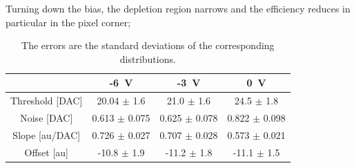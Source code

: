    Turning down the bias, the depletion region narrows and the efficiency reduces in particular in the pixel corner; 
    \begin{table}
            \begin{center}
            \begin{tabular}{| c |  c | c | c |}
            \hline
               & -\SI{6}{V} & -\SI{3}{V} & \SI{0}{V}\\
            \hline
            \hline
            Threshold [DAC] & 20.04 $\pm$ 1.6 & 21.0 $\pm$ 1.6 & 24.5 $\pm$ 1.8\\
            Noise [DAC] & 0.613 $\pm$ 0.075 & 0.625 $\pm$ 0.078 & 0.822 $\pm$ 0.098\\
            Slope [au/DAC] & 0.726 $\pm$ 0.027 & 0.707 $\pm$ 0.028  & 0.573 $\pm$ 0.021\\
            Offset [au] & -10.8 $\pm$ 1.9 & -11.2 $\pm$ 1.8 & -11.1 $\pm$ 1.5 \\
            \hline
            \end{tabular}
            \caption{The errors are the standard deviations of the corresponding distributions.}
            \label{tab:parameters_vs_bias}
            \end{center}
        \end{table}  
        
